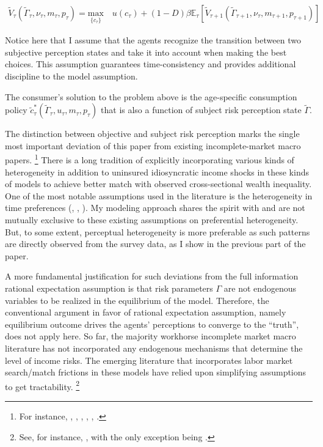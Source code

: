 \begin{equation}
\begin{split}
\tilde V_{\tau}(\tilde \Gamma_\tau, \nu_\tau, m_\tau, p_\tau) = \underset{\{c_\tau\}}{\textrm{max}} \quad u(c_\tau) + (1-D)\beta \mathbb{E}_{\tau}\left[\tilde V_{\tau+1}(\tilde \Gamma_{\tau+1}, \nu_\tau,m_{\tau+1}, p_{\tau+1})\right] 
\end{split}
\end{equation}

Notice here that I assume that the agents recognize the transition between two subjective perception states and take it into account when making the best choices. This assumption guarantees time-consistency and provides additional discipline to the model assumption.  

The consumer's solution to the problem above is the age-specific consumption policy $\tilde c_\tau^*(\tilde \Gamma_\tau,u_\tau, m_\tau,p_\tau)$ that is also a function of subject risk perception state $\tilde \Gamma$.

The distinction between objective and subject risk perception marks the single most important deviation of this paper from existing incomplete-market macro papers. \footnote{For instance, \cite{bewley1976permanent}, \cite{huggett1993risk}, \cite{aiyagari1994uninsured}, \cite{krusell1998income},  \cite{krueger2016macroeconomics},  \cite{carroll2017distribution}.} There is a long tradition of explicitly incorporating various kinds of heterogeneity in addition to uninsured idiosyncratic income shocks in these kinds of models to achieve better match with observed cross-sectional wealth inequality. One of the most notable assumptions used in the literature is the heterogeneity in time preferences (\cite{krusell1998income}, \cite{carroll2017distribution}, \cite{krueger2016macroeconomics}). My modeling approach shares the spirit with and are not mutually exclusive to these existing assumptions on preferential heterogeneity. But, to some extent, perceptual heterogeneity is more preferable as such patterns are directly observed from the survey data, as I show in the previous part of the paper.  


A more fundamental justification for such deviations from the full information rational expectation assumption is that risk parameters $\Gamma$ are not endogenous variables to be realized in the equilibrium of the model. Therefore, the conventional argument in favor of rational expectation assumption, namely equilibrium outcome drives the agents' perceptions to converge to the ``truth'', does not apply here. So far, the majority workhorse incomplete market macro literature has not incorporated any endogenous mechanisms that determine the level of income risks. The emerging literature that incorporates labor market search/match frictions in these models have relied upon simplifying assumptions to get tractability. \footnote{ See, for instance, \cite{mckay2017time,acharya2020understanding,ravn2021macroeconomic},  with the only exception being \cite{ravn2017job}.}

